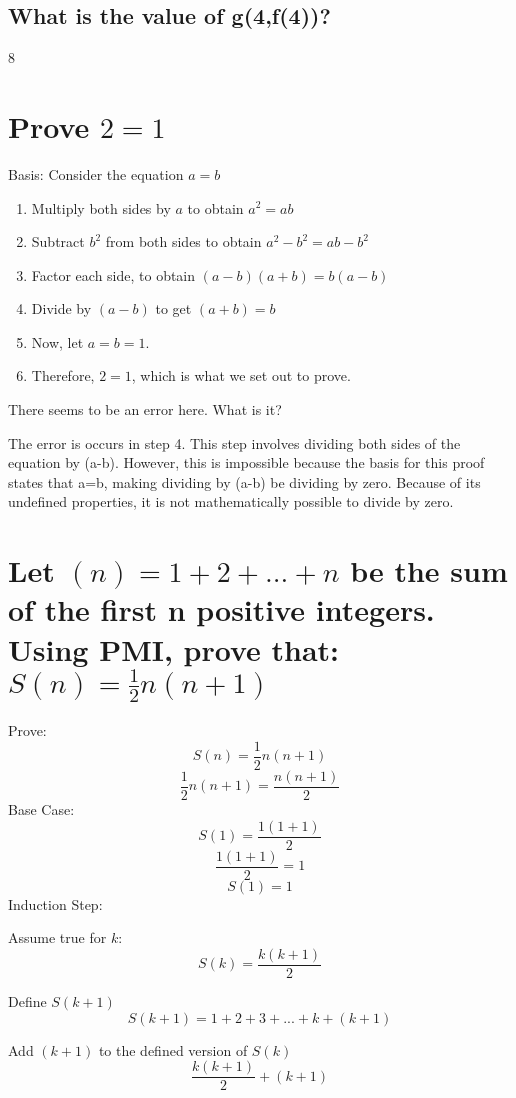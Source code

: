 \documentclass{article}
\begin{document}
\subsection{What is the value of g(4,f(4))?}
\begin{center}
	8
\end{center}

\section{Prove $2 = 1$}
Basis: Consider the equation $a = b$
\begin{enumerate}
	\item Multiply both sides by $a$ to obtain $a^{2} = ab$
	\item Subtract $b^2$ from both sides to obtain $a^2 - b^2 = ab - b^2$
	\item Factor each side, to obtain $(a-b)(a+b) = b(a-b)$
	\item Divide by $(a - b)$ to get $(a+b) = b$
	\item Now, let $a = b = 1$.
	\item Therefore, $2 = 1$, which is what we set out to prove.
\end{enumerate}
There seems to be an error here.  What is it?

\begin{center}
	The error is occurs in step 4.
	This step involves dividing both sides of the equation by (a-b). However, this is impossible because the basis for this proof states that a=b, making dividing by (a-b) be dividing by zero. Because of its undefined properties, it is not mathematically possible to divide by zero.
\end{center}

\section{Let $(n) = 1 + 2 + ... + n$ be the sum of the first n positive integers. Using PMI, prove that: $S(n) = \frac{1}{2}n(n+1)$}

Prove:
$$S(n) = \frac{1}{2}n(n+1)$$
$$\frac{1}{2}n(n+1) = \frac{n(n+1)}{2}$$
Base Case:
$$S(1) = \frac{1(1+1)}{2}$$
$$\frac{1(1+1)}{2} = 1$$
$$S(1) = 1$$
Induction Step:

Assume true for $k$:
$$S(k) = \frac{k(k+1)}{2}$$

Define $S(k+1)$
$$S(k+1) = 1 + 2 + 3 + ... + k + (k+1)$$

Add $(k+1)$ to the defined version of $S(k)$
$$\frac{k(k+1)}{2}+(k+1)$$
\end{document}
